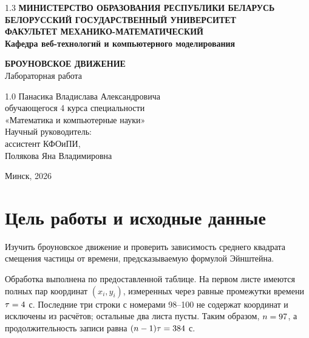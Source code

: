 \documentclass[12pt,a4paper]{article}
\begin{document}
\begin{titlepage}
\begin{center}
\begin{spacing}{1.3}
\textbf{МИНИСТЕРСТВО ОБРАЗОВАНИЯ РЕСПУБЛИКИ БЕЛАРУСЬ}\\[0.25cm]
\textbf{БЕЛОРУССКИЙ ГОСУДАРСТВЕННЫЙ УНИВЕРСИТЕТ}\\[0.25cm]
\textbf{ФАКУЛЬТЕТ МЕХАНИКО-МАТЕМАТИЧЕСКИЙ}\\[0.25cm]
\textbf{Кафедра веб-технологий и компьютерного моделирования}
\end{spacing}
\vspace{4.6cm}
\textbf{БРОУНОВСКОЕ ДВИЖЕНИЕ}\\[0.4cm]
Лабораторная работа
\end{center}
\vspace{3.6cm}
\noindent\hspace*{0.48\textwidth}\begin{minipage}{0.52\textwidth}
\begin{spacing}{1.0}
Панасика Владислава Александровича\\
обучающегося 4 курса специальности\\
«Математика и компьютерные науки»\\[0.6cm]
Научный руководитель:\\
ассистент КФОиПИ,\\
Полякова Яна Владимировна
\end{spacing}
\end{minipage}
\vfill
\begin{center}Минск, 2026\end{center}
\end{titlepage}
\setcounter{page}{2}

\tableofcontents
\newpage
\section{Цель работы и исходные данные}
Изучить броуновское движение и проверить зависимость среднего квадрата
смещения частицы от времени, предсказываемую формулой Эйнштейна.

Обработка выполнена по предоставленной таблице. На первом листе имеются
\NPoints{} полных пар координат $(x_i,y_i)$, измеренных через равные
промежутки времени $\tau=4$ с. Последние три строки с номерами
98--100 не содержат координат и исключены из расчётов; остальные два листа
пусты. Таким образом, $n=97$, а продолжительность записи равна
$(n-1)\tau=384$ с.
\end{document}
